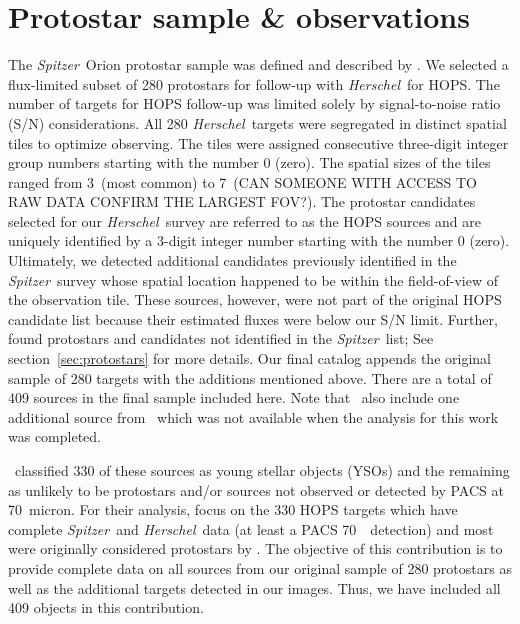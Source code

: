\documentclass[manuscript]{aastex}
\newcommand{\herschel}{{\em Herschel}}
\newcommand{\spitzer}{{\em Spitzer}}
\begin{document}
\section{Protostar sample \& observations}
\label{sec:sample}
\par
The \spitzer\ Orion protostar sample was defined and described by \cite{orion}.  We selected a flux-limited subset of 280 protostars for follow-up with \herschel\  for HOPS.  The number of targets for HOPS follow-up was limited solely by signal-to-noise ratio (S/N) considerations.  All 280 \herschel\ targets were segregated in distinct spatial tiles to optimize observing.  The tiles were assigned consecutive three-digit integer group numbers starting with the number 0 (zero).  The spatial sizes of the tiles ranged from 3\arcmin\ (most common) to 7\arcmin\ (CAN SOMEONE WITH ACCESS TO RAW DATA CONFIRM THE LARGEST FOV?).  The protostar candidates selected for our \herschel\ survey are referred to as the HOPS sources and are uniquely identified by a 3-digit integer number starting with the number 0 (zero).   Ultimately, we detected additional candidates previously identified in the \spitzer\ survey whose spatial location happened to be within the field-of-view of the observation tile.  These sources, however, were not part of the original HOPS candidate list because their estimated fluxes were below our S/N limit.  Further, \cite{pbrpaper} found protostars and candidates not identified in the \spitzer\ list; See section~\ref{sec:protostars} for more details.  Our final catalog appends the original sample of 280 targets with the additions mentioned above.  There are a total of 409 sources in the final sample included here.  Note that \cite{furlan}\ also include one additional source from \cite{tobin}\ which was not available when the analysis for this work was completed.
\par
\cite{furlan}\ classified 330 of these sources as young stellar objects (YSOs) and the remaining as unlikely to be protostars and/or sources not observed or detected by PACS at 70~micron.  For their analysis, \cite{furlan} focus on the 330 HOPS targets which have complete \spitzer\ and \herschel\ data (at least a PACS 70~\micron\ detection) and most were originally considered protostars by \cite{orion}.  The objective of this contribution is to provide complete data on all sources from our original sample of 280 protostars as well as the additional targets detected in our images.  Thus, we have included all 409 objects in this contribution.
\end{document}
